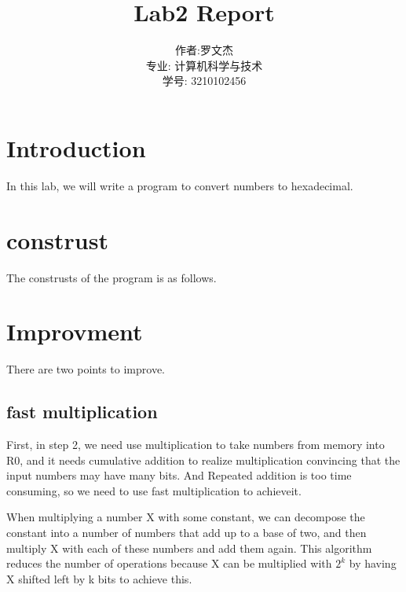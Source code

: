 \documentclass[20pt]{ctexart}
\title{Lab2 Report}
\author{作者:罗文杰\\专业: 计算机科学与技术\\学号: 3210102456}
\date{}
\begin{document}
\maketitle

\section{Introduction}
In this lab, we will write a program to convert numbers to hexadecimal.

\section{construst}
The construsts of the program is as follows.

\begin{center}
    \end{center}

\section{Improvment}
There are two points to improve.

\subsection{fast multiplication}
First, in step 2, we need use multiplication to take numbers from memory into R0, and it needs cumulative addition to realize multiplication convincing that the input numbers may have many bits. And Repeated addition is too time consuming, so we need to use fast multiplication to achieveit.

When multiplying a number X with some constant, we can decompose the constant into a number of numbers that add up to a base of two, and then multiply X with each of these numbers and add them again. This algorithm reduces the number of operations because X can be multiplied with $2^k$ by having X shifted left by k bits to achieve this.
\end{document}
